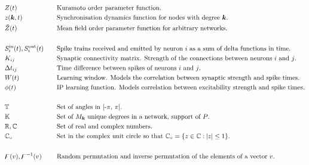 \begin{alignat*}{2}
& Z(t) &&\text{Kuramoto order parameter function.}\\
& z({\boldsymbol{k}}, t) &&\text{Synchronisation dynamics function for nodes with degree ${\boldsymbol{k}}$.}\\
& \bar{Z}(t) &&\text{Mean field order parameter function for arbitrary networks.}\\ \\
& S_i^{\rm in}(t), S_i^{\rm out}(t)\quad &&\text{Spike trains received and emitted by neuron $i$ as a sum of delta functions in time.}\\ 
& K_{ij} &&\text{Synaptic connectivity matrix. Strength of the connections between neurons $i$ and $j$.}\\
& \Delta t_{ij} &&\text{Time difference between spikes of neurons $i$ and $j$.}\\
& W(t) &&\text{Learning window. Models the correlation between synaptic strength and spike times.}\\ 
& \phi(t) &&\text{IP learning function. Models correlation between excitability strength and spike times.}\\ \\
& {\mathbb{T}} &&\text{Set of angles in [-$\pi$, $\pi$[.}\\
& {\mathbb{K}} &&\text{Set of $M_{{\boldsymbol{k}}}$ unique degrees in a network, support of $P$.}\\ 
& {\mathbb{R}}, {\mathbb{C}} &&\text{Set of real and complex numbers.}\\ 
&  \mathbb{C}_\circ && \text{Set in the complex unit circle so that $\mathbb{C}_\circ = \{ z \in {\mathbb{C}} : \: \rvert z \rvert \leq 1 \} $.} \\ \\
& {\digamma}(v), {\digamma^{-1}}(v) &&\text{Random permutation and inverse permutation of the elements of a vector $v$.}\\ 
\end{alignat*}

